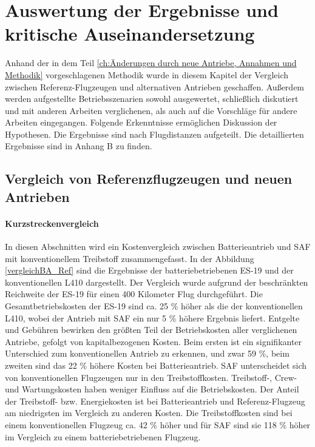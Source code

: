 \chapter{Auswertung der Ergebnisse und kritische Auseinandersetzung}
\label{ch:Auswertung der Ergebnisse}
Anhand der in dem Teil \ref{ch:Änderungen durch neue Antriebe, Annahmen und Methodik} 
vorgeschlagenen Methodik wurde in diesem Kapitel der Vergleich zwischen 
Referenz-Flugzeugen und alternativen Antrieben geschaffen.
Außerdem werden aufgestellte Betriebsszenarien sowohl ausgewertet, 
schließlich diskutiert und mit anderen Arbeiten verglichenen, 
als auch auf die Vorschläge für andere Arbeiten eingegangen.
Folgende Erkenntnisse ermöglichen Diskussion der Hypothesen. 
Die Ergebnisse sind nach Flugdistanzen aufgeteilt. Die detaillierten Ergebnisse sind in Anhang B zu finden.

\section{Vergleich von Referenzflugzeugen und neuen Antrieben}
\label{s:Ergebnisse_Flugzeuge}
\subsubsection{Kurzstreckenvergleich}
%
In diesen Abschnitten wird ein Kostenvergleich zwischen Batterieantrieb 
und SAF mit konventionellem Treibstoff zusammengefasst.
In der Abbildung \ref{vergleichBA_Ref} sind die Ergebnisse der 
batteriebetriebenen ES-19 und der konventionellen L410 dargestellt.
Der Vergleich wurde aufgrund der beschränkten Reichweite der ES-19 für einen 400 Kilometer Flug durchgeführt.
%
Die Gesamtbetriebskosten der ES-19 sind ca. 25 \% höher als die der konventionellen L410, 
wobei der Antrieb mit SAF ein nur 5 \% höhere Ergebnis liefert. 
Entgelte und Gebühren bewirken den größten Teil der Betriebskosten aller verglichenen Antriebe, 
gefolgt von kapitalbezogenen Kosten. 
Beim ersten ist ein signifikanter Unterschied zum konventionellen Antrieb zu erkennen, 
und zwar 59 \%, beim zweiten sind das 22 \% höhere Kosten bei Batterieantrieb. 
%
SAF unterscheidet sich von konventionellen Flugzeugen nur in den Treibstoffkosten.
Treibstoff-, Crew- und Wartungskosten haben weniger Einfluss auf die Betriebskosten.
Der Anteil der Treibstoff- bzw. Energiekosten ist bei Batterieantrieb und Referenz-Flugzeug 
am niedrigsten im Vergleich zu anderen Kosten. 
Die Treibstoffkosten sind bei einem konventionellen Flugzeug ca. 42 \% höher und für SAF sind sie 118 \% höher
im Vergleich zu einem batteriebetriebenen Flugzeug. 


